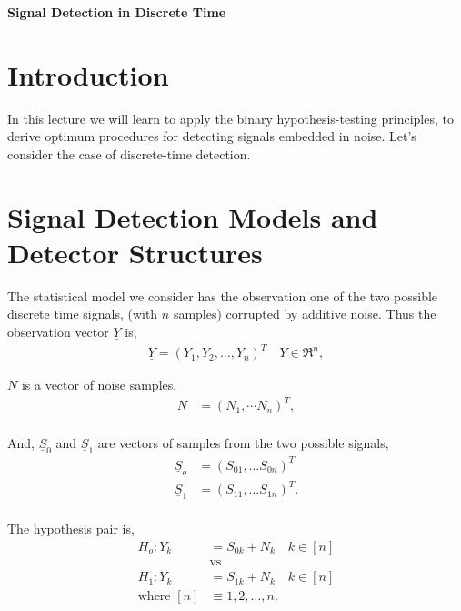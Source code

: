\documentclass[12pt]{report}
\begin{document}
	\maketitle
	
	\begin{center}
		{\Large \bf Signal Detection in Discrete Time}
	\end{center}
	
	
	\section{Introduction}
	In this lecture we will learn to apply the binary hypothesis-testing principles, to derive optimum procedures for detecting signals embedded in noise. Let's consider the case of discrete-time detection.
	
	\section{Signal Detection Models and Detector Structures}
	The statistical model we consider has the observation one of the two possible discrete time signals, (with $n$ samples) corrupted by additive noise.
	Thus the observation vector $\underline Y$ is,
	\begin{align*} \underline Y = (Y_1,Y_2, \ldots ,Y_n)^T  \quad  Y\in \Re^n ,
	\end{align*}
	
	$\underline N$ is a vector of noise samples,
	\begin{align*}
	\underline N &= (N_1, \cdots N_n)^T , \\
	\end{align*}
	
	And, $\underline S_0$ and $\underline S_1$ are vectors of samples from the two possible signals,
	\begin{align*}
	\underline S_o &= (S_{01}, \ldots S_{0n})^T\\
	\underline S_1 &= (S_{11}, \ldots S_{1n})^T .\\
	\end{align*}
	
	The hypothesis pair is,
	\begin{align*}
	H_o: Y_k &= S_{0k}+N_k \quad k \in [n]\\
	&\text{vs}\\
	H_1: Y_k &= S_{1k} + N_k \quad k \in [n]\\
	\text{where } [n] &\equiv 1,2,\ldots,n.
	\end{align*}
	
\end{document}
